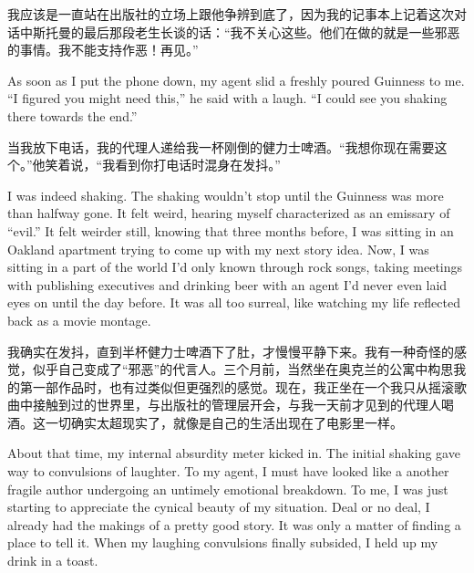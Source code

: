 \ifdefined\chs
我应该是一直站在出版社的立场上跟他争辨到底了，因为我的记事本上记着这次对话中斯托曼的最后那段老生长谈的话：“我不关心这些。他们在做的就是一些邪恶的事情。我不能支持作恶！再见。”%
\fi

\ifdefined\eng
As soon as I put the phone down, my agent slid a freshly poured Guinness to me. ``I figured you might need this,'' he said with a laugh. ``I could see you shaking there towards the end.''
\fi

\ifdefined\chs
当我放下电话，我的代理人递给我一杯刚倒的健力士啤酒。“我想你现在需要这个。”他笑着说，“我看到你打电话时混身在发抖。”
\fi

\ifdefined\eng
I was indeed shaking. The shaking wouldn't stop until the Guinness was more than halfway gone. It felt weird, hearing myself characterized as an emissary of ``evil.'' %
It felt weirder still, knowing that three months before, I was sitting in an Oakland apartment trying to come up with my next story idea. Now, I was sitting in a part of the world I'd only known through rock songs, taking meetings with publishing executives and drinking beer with an agent I'd never even laid eyes on until the day before. It was all too surreal, like watching my life reflected back as a movie montage.
\fi

\ifdefined\chs
我确实在发抖，直到半杯健力士啤酒下了肚，才慢慢平静下来。我有一种奇怪的感觉，似乎自己变成了“邪恶”的代言人。三个月前，当然坐在奥克兰的公寓中构思我的第一部作品时，也有过类似但更强烈的感觉。现在，我正坐在一个我只从摇滚歌曲中接触到过的世界里，与出版社的管理层开会，与我一天前才见到的代理人喝酒。这一切确实太超现实了，就像是自己的生活出现在了电影里一样。
\fi

\ifdefined\eng
About that time, my internal absurdity meter kicked in. The initial shaking gave way to convulsions of laughter. To my agent, I must have looked like a another fragile author undergoing an untimely emotional breakdown. To me, I was just starting to appreciate the cynical beauty of my situation. Deal or no deal, I already had the makings of a pretty good story. It was only a matter of finding a place to tell it. When my laughing convulsions finally subsided, I held up my drink in a toast.
\fi

